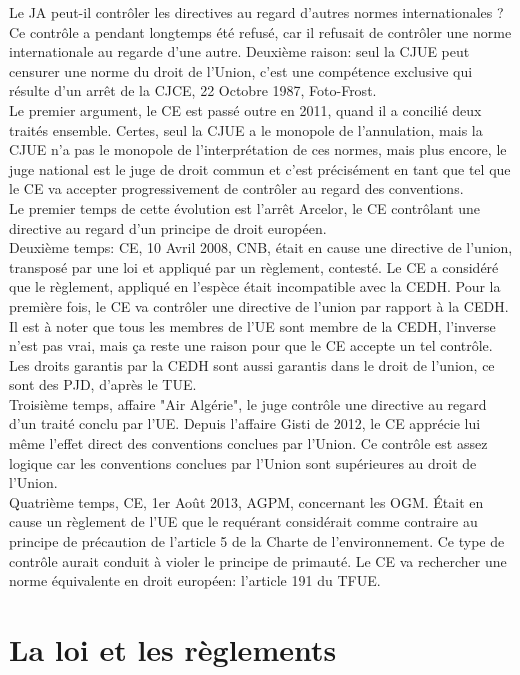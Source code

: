 \documentclass[10pt, a4paper, openany]{book}
\begin{document}
Le JA peut-il contrôler les directives au regard d'autres normes internationales ? Ce contrôle a pendant longtemps été refusé, car il refusait de contrôler une norme internationale au regarde d'une autre. Deuxième raison: seul la CJUE peut censurer une norme du droit de l'Union, c'est une compétence exclusive qui résulte d'un arrêt de la CJCE, 22 Octobre 1987, Foto-Frost. \\
Le premier argument, le CE est passé outre en 2011, quand il a concilié deux traités ensemble. Certes, seul la CJUE a le monopole de l'annulation, mais la CJUE n'a pas le monopole de l'interprétation de ces normes, mais plus encore, le juge national est le juge de droit commun et c'est précisément en tant que tel que le CE va accepter progressivement de contrôler au regard des conventions. \\
Le premier temps de cette évolution est l'arrêt Arcelor, le CE contrôlant une directive au regard d'un principe de droit européen. \\
Deuxième temps: CE, 10 Avril 2008, CNB, était en cause une directive de l'union, transposé par une loi et appliqué par un règlement, contesté. Le CE a considéré que le règlement, appliqué en l'espèce était incompatible avec la CEDH. Pour la première fois, le CE va contrôler une directive de l'union par rapport à la CEDH. Il est à noter que tous les membres de l'UE sont membre de la CEDH, l'inverse n'est pas vrai, mais ça reste une raison pour que le CE accepte un tel contrôle. Les droits garantis par la CEDH sont aussi garantis dans le droit de l'union, ce sont des PJD, d'après le TUE. \\
Troisième temps, affaire "Air Algérie", le juge contrôle une directive au regard d'un traité conclu par l'UE. Depuis l'affaire Gisti de 2012, le CE apprécie lui même l'effet direct des conventions conclues par l'Union. Ce contrôle est assez logique car les conventions conclues par l'Union sont supérieures au droit de l'Union. \\
Quatrième temps, CE, 1er Août 2013, AGPM, concernant les OGM. Était en cause un règlement de l'UE que le requérant considérait comme contraire au principe de précaution de l'article 5 de la Charte de l'environnement. Ce type de contrôle aurait conduit à violer le principe de primauté. Le CE va rechercher une norme équivalente en droit européen: l'article 191 du TFUE. 


\chapter{La loi et les règlements}
\end{document}

